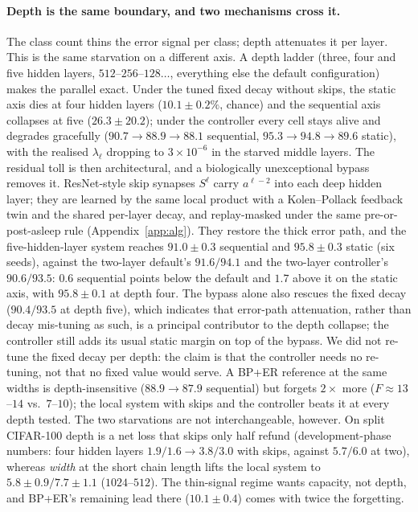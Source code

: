\documentclass{article}
\begin{document}
\paragraph{Depth is the same boundary, and two mechanisms cross it.}
The class count thins the error signal per class; depth attenuates it per layer. This is the
same starvation on a different axis. A depth ladder (three, four and five hidden layers,
$512$--$256$--$128\ldots$, everything else the default configuration) makes the parallel
exact. Under the tuned fixed decay without skips, the static axis dies at four hidden layers
($10.1\pm0.2\%$, chance) and the sequential axis collapses at five ($26.3\pm20.2$); under the
controller every cell stays alive and degrades gracefully ($90.7\to88.9\to88.1$ sequential,
$95.3\to94.8\to89.6$ static), with the realised $\lambda_\ell$ dropping to $3\times10^{-6}$
in the starved middle layers. The residual toll is then architectural, and a biologically
unexceptional bypass removes it. ResNet-style skip synapses $S^\ell$ carry $a^{\ell-2}$ into
each deep hidden layer; they are learned by the same local product with a Kolen--Pollack
feedback twin and the shared per-layer decay, and replay-masked under the same
pre-or-post-asleep rule (Appendix~\ref{app:alg}). They restore the thick error path, and the
five-hidden-layer system reaches $91.0\pm0.3$ sequential and $95.8\pm0.3$ static (six seeds),
against the two-layer default's $91.6/94.1$ and the two-layer controller's $90.6/93.5$: $0.6$
sequential points below the default and $1.7$ above it on the static axis, with $95.8\pm0.1$
at depth four. The bypass alone also rescues the fixed decay ($90.4/93.5$ at depth five),
which indicates that error-path attenuation, rather than decay mis-tuning as such, is a
principal contributor to the depth collapse; the controller still adds its usual static
margin on top of the bypass. We did not re-tune the fixed decay per depth: the claim is that
the controller needs no re-tuning, not that no fixed value would serve. A BP+ER reference at
the same widths is depth-insensitive ($88.9\to87.9$ sequential) but forgets $2\times$ more
($F\approx13$--$14$ vs.\ $7$--$10$); the local system with skips and the controller beats it
at every depth tested. The two starvations are not interchangeable, however. On split
CIFAR-100 depth is a net loss that skips only half refund (development-phase numbers: four
hidden layers $1.9/1.6\to3.8/3.0$ with skips, against $5.7/6.0$ at two), whereas \emph{width}
at the short chain length lifts the local system to $5.8\pm0.9/7.7\pm1.1$ ($1024$--$512$).
The thin-signal regime wants capacity, not depth, and BP+ER's remaining lead there
($10.1\pm0.4$) comes with twice the forgetting.
\end{document}
